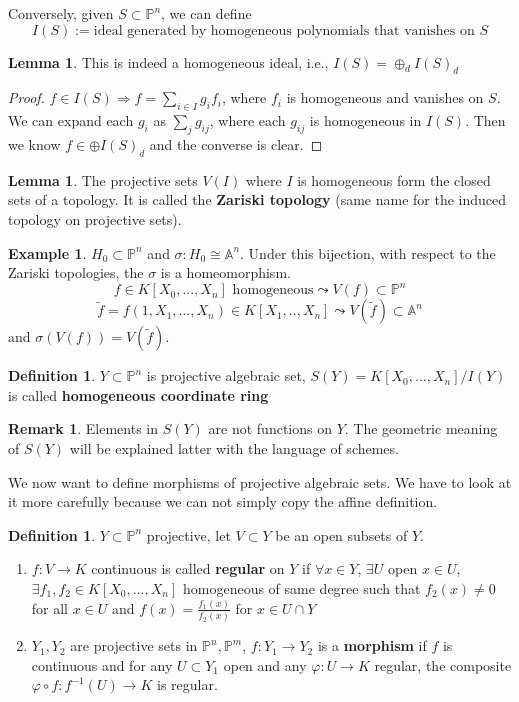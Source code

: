 \documentclass[11pt]{article}
\theoremstyle{definition}
\newtheorem{lemma}[thm]{Lemma}
\newtheorem{dfn}[thm]{Definition}
\newtheorem{rmk}[thm]{Remark}
\newtheorem{ex}[thm]{Example}
\newcommand{\affn}{\mathbb A}
\newcommand{\proj}{\mathbb P}
\newcommand{\Lrta}{\Longrightarrow}
\newcommand{\lrta}{\longrightarrow}
\begin{document}
Conversely, given $S\subset \proj^n$, we can define 
$$
I(S):=\text{ideal generated by homogeneous polynomials that vanishes on $S$}
$$
\begin{lemma}
This is indeed a homogeneous ideal, i.e., $I(S)=\oplus_d I(S)_d$
\end{lemma}
\begin{proof}
$f\in I(S)\Lrta f=\sum_{i\in I}g_i f_i$, where $f_i$ is homogeneous and vanishes on $S$. We can expand each $g_i$ as $\sum_j g_{ij}$, where each $g_{ij}$ is homogeneous in $I(S)$. Then we know $f\in \oplus I(S)_d$ and the converse is clear.
\end{proof}
\begin{lemma}
The projective sets $V(I)$ where $I$ is homogeneous form the closed sets of a topology. It is called the \textbf{Zariski topology} (same name for the induced topology on projective sets).
\end{lemma}
\begin{ex}
$H_0\subset \proj^n$ and $\sigma: H_0\cong \affn^n$. Under this bijection, with respect to the Zariski topologies, the  $\sigma $ is a homeomorphism.
$$
f\in K[X_0,...,X_n]\text{ homogeneous} \leadsto V(f)\subset \proj^n
$$
$$
\tilde{f}=f(1,X_1,...,X_n)\in K[X_1,..,X_n]\leadsto V(\tilde{f})\subset \affn^n
$$
and $\sigma(V(f))=V(\tilde{f})$.
\end{ex}
\begin{dfn}
$Y\subset \proj^n$ is  projective algebraic set,  $S(Y)=K[X_0,...,X_n]/I(Y)$ is called  \textbf{homogeneous coordinate ring}
\end{dfn}
\begin{rmk} Elements in $S(Y)$ are not functions on $Y$. The geometric meaning of $S(Y)$ will be explained latter with the language of schemes.
\end{rmk}
We now want to define morphisms of  projective algebraic sets. We have to look at it more carefully because we can not simply copy the affine definition.
\begin{dfn}
$Y\subset \proj^n$ projective, let $V\subset Y $ be an open subsets of $Y$.
\begin{enumerate}[label=(\arabic*)]
\item $f: V\lrta K$ continuous is called \textbf{regular} on $Y$ if $\forall x\in Y$, $\exists U$ open $x\in U$, $\exists f_1,f_2\in K[X_0,...,X_n]$ homogeneous of same degree such that $f_2(x)\neq 0$ for all $x\in U$ and $f(x)=\frac{f_1(x)}{f_2(x)}$ for $x\in U\cap Y$
\item $Y_1,Y_2$ are projective sets in $\proj^n,\proj^m$, $f: Y_1\lrta Y_2$ is a \textbf{morphism} if $f$ is continuous and for any $U\subset Y_1$ open and any $\varphi:U\lrta K$ regular, the composite $\varphi\circ f: f^{-1}(U)\lrta K$ is regular.
\end{enumerate}
\end{dfn}
\end{document}
